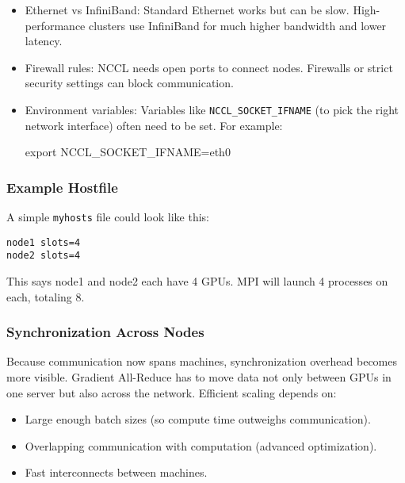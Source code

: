 \documentclass[
  letterpaper,
  DIV=11,
  numbers=noendperiod]{scrreprt}
\newenvironment{Shaded}{\begin{snugshade}}{\end{snugshade}}
\newcommand{\BuiltInTok}[1]{\textcolor[rgb]{0.00,0.23,0.31}{#1}}
\newcommand{\NormalTok}[1]{\textcolor[rgb]{0.00,0.23,0.31}{#1}}
\newcommand{\OperatorTok}[1]{\textcolor[rgb]{0.37,0.37,0.37}{#1}}
\newcommand{\VariableTok}[1]{\textcolor[rgb]{0.07,0.07,0.07}{#1}}
\providecommand{\tightlist}{%
  \setlength{\itemsep}{0pt}\setlength{\parskip}{0pt}}
\begin{document}
\begin{itemize}
\item
  Ethernet vs InfiniBand: Standard Ethernet works but can be slow.
  High-performance clusters use InfiniBand for much higher bandwidth and
  lower latency.
\item
  Firewall rules: NCCL needs open ports to connect nodes. Firewalls or
  strict security settings can block communication.
\item
  Environment variables: Variables like \texttt{NCCL\_SOCKET\_IFNAME}
  (to pick the right network interface) often need to be set. For
  example:

\begin{Shaded}
\begin{Highlighting}[]
\BuiltInTok{export} \VariableTok{NCCL\_SOCKET\_IFNAME}\OperatorTok{=}\NormalTok{eth0}
\end{Highlighting}
\end{Shaded}
\end{itemize}

\subsubsection{Example Hostfile}\label{example-hostfile}

A simple \texttt{myhosts} file could look like this:

\begin{verbatim}
node1 slots=4
node2 slots=4
\end{verbatim}

This says node1 and node2 each have 4 GPUs. MPI will launch 4 processes
on each, totaling 8.

\subsubsection{Synchronization Across
Nodes}\label{synchronization-across-nodes}

Because communication now spans machines, synchronization overhead
becomes more visible. Gradient All-Reduce has to move data not only
between GPUs in one server but also across the network. Efficient
scaling depends on:

\begin{itemize}
\tightlist
\item
  Large enough batch sizes (so compute time outweighs communication).
\item
  Overlapping communication with computation (advanced optimization).
\item
  Fast interconnects between machines.
\end{itemize}
\end{document}

